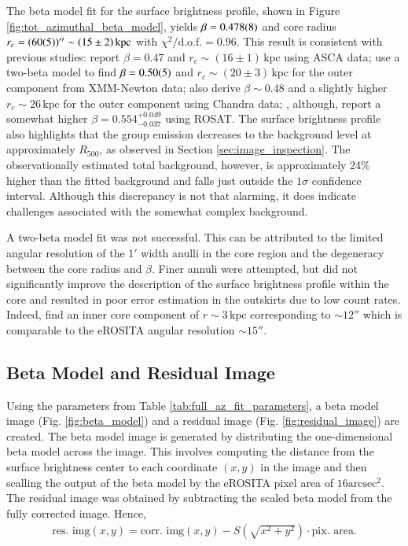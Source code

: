 The beta model fit for the surface brightness profile, shown in Figure \ref{fig:tot_azimuthal_beta_model}, yields \(\beta = \num{0.478\pm0.008}\) and core radius \(r_c = (\num{60\pm5})'' \sim (15\pm2)\,\text{kpc}\) with \(\chi^2/\text{d.o.f.} = 0.96\). This result is consistent with previous studies: \cite{Kawaharada_2003} report \(\beta = 0.47\) and \(r_c \sim (16\pm1)\,\text{kpc}\) using ASCA data; \cite{Kawaharada_2009} use a two-beta model to find \(\beta = \num{0.50\pm0.05}\) and \(r_c \sim (20\pm3)\,\text{kpc}\) for the outer component from XMM-Newton data; \cite{Sun_2003} also derive \(\beta \sim 0.48\) and a slightly higher \(r_c \sim 26\,\text{kpc}\) for the outer component using Chandra data; \cite{Reiprich_2002}, although, report a somewhat higher \(\beta = 0.554^{+0.049}_{-0.037}\) using ROSAT. The surface brightness profile also highlights that the group emission decreases to the background level at approximately \(R_{500}\), as observed in Section \ref{sec:image_inspection}. The observationally estimated total background, however, is approximately 24\% higher than the fitted background and falls just outside the \(1\sigma\) confidence interval. Although this discrepancy is not that alarming, it does indicate challenges associated with the somewhat complex background. 

A two-beta model fit was not successful. This can be attributed to the limited angular resolution of the \(1'\) width anulli in the core region and the degeneracy between the core radius and \(\beta\). Finer annuli were attempted, but did not significantly improve the description of the surface brightness profile within the core and resulted in poor error estimation in the outskirts due to low count rates. Indeed, \cite{Kawaharada_2009} find an inner core component of \(r \sim 3\,\text{kpc}\) corresponding to \(\sim 12'' \) which is comparable to the eROSITA angular resolution \(\sim 15''\).
\subsection{Beta Model and Residual Image}
Using the parameters from Table \ref{tab:full_az_fit_parameters}, a beta model image (Fig. \ref{fig:beta_model}) and a residual image (Fig. \ref{fig:residual_image}) are created. The beta model image is generated by distributing the one-dimensional beta model across the image. This involves computing the distance from the surface brightness center to each coordinate \((x, y)\) in the image and then scalling the output of the beta model by the eROSITA pixel area of \(16\text{arcsec}^2\). The residual image was obtained by subtracting the scaled beta model from the fully corrected image. Hence,
\begin{align*}
    \text{res. img}(x, y) = \text{corr. img}(x, y) - S\left(\sqrt{x^2 + y^2}\right) \cdot \text{pix. area}.
\end{align*}

